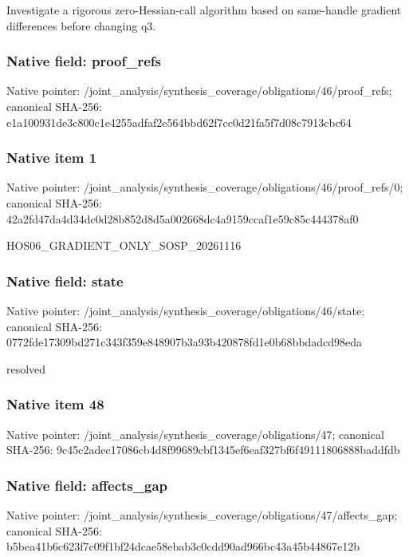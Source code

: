 \documentclass[10pt,a4paper]{article}
\begin{document}
\begingroup\raggedright\sloppy Investigate a rigorous zero-Hessian-call algorithm based on same-handle gradient differences before changing q3.\par\endgroup

\subsubsection{Native field: proof\_\allowbreak{}refs}
Native pointer: /joint\_\allowbreak{}analysis/synthesis\_\allowbreak{}coverage/obligations/46/proof\_\allowbreak{}refs; canonical SHA-256: e1a100931de3c800c1e4255adfaf2e564bbd62f7cc0d21fa5f7d08c7913cbc64

\subsubsection{Native item 1}
Native pointer: /joint\_\allowbreak{}analysis/synthesis\_\allowbreak{}coverage/obligations/46/proof\_\allowbreak{}refs/0; canonical SHA-256: 42a2fd47da4d34dc0d28b852d8d5a002668dc4a9159ccaf1e59c85c444378af0

\begingroup\raggedright\sloppy HOS06\_\allowbreak{}GRADIENT\_\allowbreak{}ONLY\_\allowbreak{}SOSP\_\allowbreak{}20261116\par\endgroup

\subsubsection{Native field: state}
Native pointer: /joint\_\allowbreak{}analysis/synthesis\_\allowbreak{}coverage/obligations/46/state; canonical SHA-256: 0772fde17309bd271c343f359e848907b3a93b420878fd1e0b68bbdadcd98eda

\begingroup\raggedright\sloppy resolved\par\endgroup

\subsubsection{Native item 48}
Native pointer: /joint\_\allowbreak{}analysis/synthesis\_\allowbreak{}coverage/obligations/47; canonical SHA-256: 9c45c2adec17086cb4d8f99689cbf1345ef6eaf327bf6f49111806888baddfdb

\subsubsection{Native field: affects\_\allowbreak{}gap}
Native pointer: /joint\_\allowbreak{}analysis/synthesis\_\allowbreak{}coverage/obligations/47/affects\_\allowbreak{}gap; canonical SHA-256: b5bea41b6c623f7c09f1bf24dcae58ebab3c0cdd90ad966bc43a45b44867e12b
\end{document}
